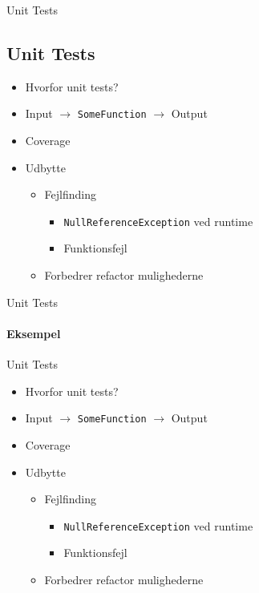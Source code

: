 \begin{frame}{Unit Tests}
\subsection{Unit Tests}

\begin{itemize}
	\item Hvorfor unit tests?
	\item Input $\rightarrow$ \texttt{SomeFunction} $\rightarrow$  Output
	\item Coverage
	\item Udbytte
	\begin{itemize}
		\item Fejlfinding
		\begin{itemize}
			\item \texttt{NullReferenceException} ved runtime
			\item Funktionsfejl
		\end{itemize}
		\item Forbedrer refactor mulighederne
	\end{itemize}
\end{itemize}

\end{frame}
\begin{frame}{Unit Tests}
\framesubtitle{Eksempel}
\hbox{\hspace{5 mm}\scalebox{0.8}{
	  }} 

\end{frame}

\begin{frame}{Unit Tests}

\begin{itemize}
	\item Hvorfor unit tests?
	\item Input $\rightarrow$ \texttt{SomeFunction} $\rightarrow$  Output
	\item Coverage
	\item Udbytte
	\begin{itemize}
		\item Fejlfinding
				\begin{itemize}
					\item \texttt{NullReferenceException} ved runtime
					\item Funktionsfejl
				\end{itemize}
		\item Forbedrer refactor mulighederne
	\end{itemize}
\end{itemize}

\end{frame}
